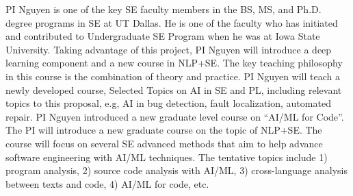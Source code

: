 

PI Nguyen is one of the key SE faculty members in the BS, MS, and Ph.D.
degree programs in SE at UT Dallas. 
%
He is one of the faculty who has initiated and contributed to
Undergraduate SE Program when he was at Iowa State University.
Taking advantage of this project, PI Nguyen will introduce a deep
learning component and a new course in NLP+SE.
The key teaching philosophy in this course is the combination of theory and practice.
PI Nguyen will teach a newly developed course, 
Selected Topics on AI in SE and PL,
including relevant topics to this proposal, e.g, 
AI in bug detection, fault localization, automated repair. 
PI Nguyen introduced a new graduate level course on ``AI/ML for
Code''. The PI will introduce a new graduate course on the topic of
NLP+SE.
The course will focus on several SE advanced methods that
aim to help advance software engineering with AI/ML techniques. 
The tentative topics include 1) program analysis, 2) source code
analysis with AI/ML, 3) cross-language analysis between texts and code,
4) AI/ML for code, etc.



